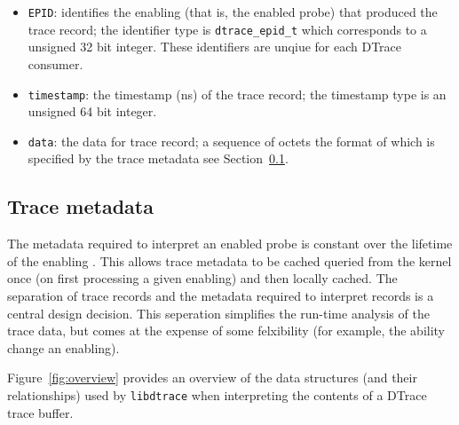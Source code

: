 \begin{itemize}
	\item{\texttt{EPID}}: identifies the enabling (that is, the enabled
		probe) that produced the trace record; the identifier type is
		\texttt{dtrace\_epid\_t} which corresponds to a unsigned 32 bit
		integer.  These identifiers are unqiue for each DTrace
		consumer.

	\item{\texttt{timestamp}:} the timestamp (ns) of the trace record; the
		timestamp type is an unsigned 64 bit integer.

	\item{\texttt{data}:} the data for trace record; a sequence of octets
		the format of which is specified by the trace metadata see
		Section~\ref{subsec:probe_data_structures}.
\end{itemize}

\subsection{Trace metadata}
\label{subsec:probe_data_structures}

The metadata required to interpret an enabled probe is constant over
the lifetime of the enabling \cite{DTrace2004}. This allows trace metadata
to be cached queried from the kernel once (on first processing a given
enabling) and then locally cached.  The separation of trace records and
the metadata required to interpret records is a central design decision.
This seperation simplifies the run-time analysis of the trace data, but comes
at the expense of some felxibility (for example, the ability change an
enabling).


Figure~\ref{fig:overview} provides an overview of the data structures (and
their relationships) used by \texttt{libdtrace} when interpreting the contents
of a DTrace trace buffer.

